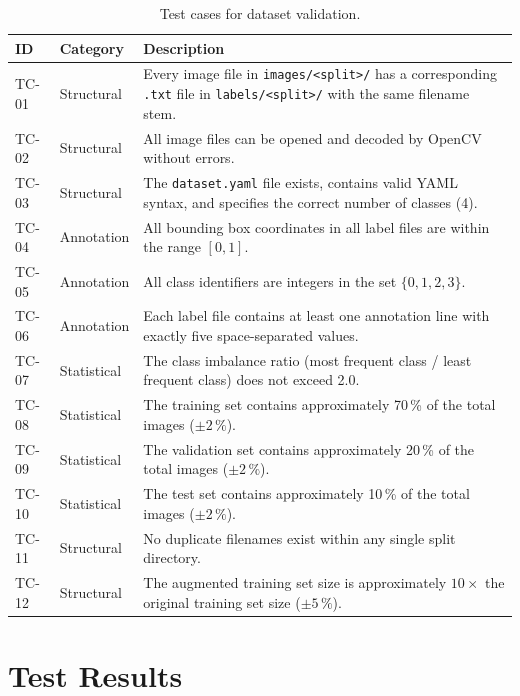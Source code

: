 \documentclass[a4paper,12pt,twoside]{report}
\begin{document}
\begin{table}[htbp]
  \centering
  \caption{Test cases for dataset validation.}
  \label{tab:test-cases}
  \small
  \begin{tabularx}{\textwidth}{llX}
    \toprule
    \textbf{ID} & \textbf{Category} & \textbf{Description} \\
    \midrule
    TC-01 & Structural & Every image file in \texttt{images/<split>/} has a
            corresponding \texttt{.txt} file in \texttt{labels/<split>/} with
            the same filename stem. \\
    TC-02 & Structural & All image files can be opened and decoded by OpenCV
            without errors. \\
    TC-03 & Structural & The \texttt{dataset.yaml} file exists, contains valid
            YAML syntax, and specifies the correct number of classes (4). \\
    TC-04 & Annotation & All bounding box coordinates in all label files are
            within the range $[0, 1]$. \\
    TC-05 & Annotation & All class identifiers are integers in the set
            $\{0, 1, 2, 3\}$. \\
    TC-06 & Annotation & Each label file contains at least one annotation
            line with exactly five space-separated values. \\
    TC-07 & Statistical & The class imbalance ratio (most frequent class / least
            frequent class) does not exceed 2.0. \\
    TC-08 & Statistical & The training set contains approximately 70\,\% of
            the total images ($\pm 2\,\%$). \\
    TC-09 & Statistical & The validation set contains approximately 20\,\% of
            the total images ($\pm 2\,\%$). \\
    TC-10 & Statistical & The test set contains approximately 10\,\% of the
            total images ($\pm 2\,\%$). \\
    TC-11 & Structural & No duplicate filenames exist within any single split
            directory. \\
    TC-12 & Structural & The augmented training set size is approximately
            $10 \times$ the original training set size ($\pm 5\,\%$). \\
    \bottomrule
  \end{tabularx}
\end{table}

\section{Test Results}
\label{sec:test-results}
\end{document}
